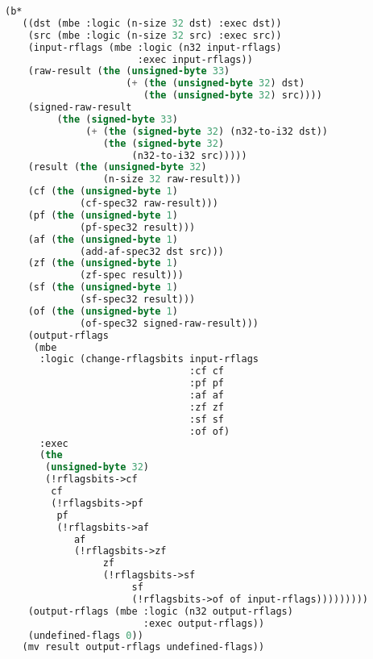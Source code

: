 \documentclass[a4paper]{article}
\begin{document}
\begin{tcolorbox}[breakable]
\begin{parcolumns}{2}
{\begin{lstlisting}[language=lisp]
  (b*
   ((dst (mbe :logic (n-size 32 dst) :exec dst))
    (src (mbe :logic (n-size 32 src) :exec src))
    (input-rflags (mbe :logic (n32 input-rflags)
                       :exec input-rflags))
    (raw-result (the (unsigned-byte 33)
                     (+ (the (unsigned-byte 32) dst)
                        (the (unsigned-byte 32) src))))
    (signed-raw-result
         (the (signed-byte 33)
              (+ (the (signed-byte 32) (n32-to-i32 dst))
                 (the (signed-byte 32)
                      (n32-to-i32 src)))))
    (result (the (unsigned-byte 32)
                 (n-size 32 raw-result)))
    (cf (the (unsigned-byte 1)
             (cf-spec32 raw-result)))
    (pf (the (unsigned-byte 1)
             (pf-spec32 result)))
    (af (the (unsigned-byte 1)
             (add-af-spec32 dst src)))
    (zf (the (unsigned-byte 1)
             (zf-spec result)))
    (sf (the (unsigned-byte 1)
             (sf-spec32 result)))
    (of (the (unsigned-byte 1)
             (of-spec32 signed-raw-result)))
    (output-rflags
     (mbe
      :logic (change-rflagsbits input-rflags
                                :cf cf
                                :pf pf
                                :af af
                                :zf zf
                                :sf sf
                                :of of)
      :exec
      (the
       (unsigned-byte 32)
       (!rflagsbits->cf
        cf
        (!rflagsbits->pf
         pf
         (!rflagsbits->af
            af
            (!rflagsbits->zf
                 zf
                 (!rflagsbits->sf
                      sf
                      (!rflagsbits->of of input-rflags)))))))))
    (output-rflags (mbe :logic (n32 output-rflags)
                        :exec output-rflags))
    (undefined-flags 0))
   (mv result output-rflags undefined-flags))
\end{lstlisting}}
\colplacechunks
\end{parcolumns}


\end{tcolorbox}
\end{document}
